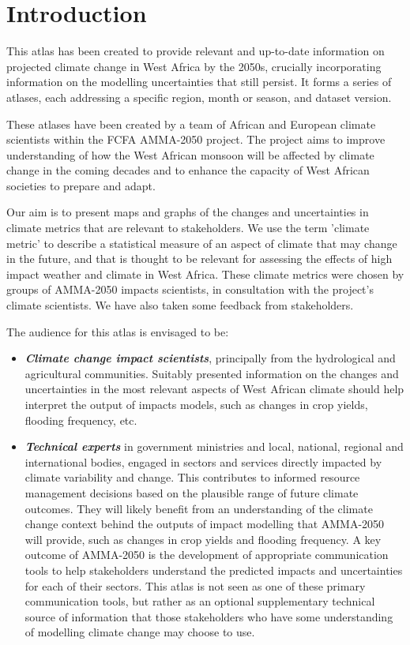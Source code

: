 \section{Introduction} \label{sec:intro}

This atlas has been created to provide relevant and up-to-date information on projected climate change in West Africa by the 2050s, crucially incorporating information on the modelling uncertainties that still persist. It forms a series of atlases, each addressing a specific region, month or season, and dataset version.

These atlases have been created by a team of African and European climate scientists within the FCFA AMMA-2050 project. The project aims to improve understanding of how the West African monsoon will be affected by climate change in the coming decades and to enhance the capacity of West African societies to prepare and adapt. 

Our aim is to present maps and graphs of the changes and uncertainties in climate metrics that are relevant to stakeholders. We use the term 'climate metric' to describe a statistical measure of an aspect of climate that may change in the future, and that is thought to be relevant for assessing the effects of high impact weather and climate in West Africa. These climate metrics were chosen by groups of AMMA-2050 impacts scientists, in consultation with the project's climate scientists. We have also taken some feedback from stakeholders.

The audience for this atlas is envisaged to be:

\begin{itemize}
  \item \textbf{\textit{Climate change impact scientists}}, principally from the hydrological and agricultural communities. Suitably presented information on the changes and uncertainties in the most relevant aspects of West African climate should help interpret the output of impacts models, such as changes in crop yields, flooding frequency, etc.
  \item \textbf{\textit{Technical experts}} in government ministries and local, national, regional and international bodies, engaged in sectors and services directly impacted by climate variability and change. This contributes to informed resource management decisions based on the plausible range of future climate outcomes. They will likely benefit from an understanding of the climate change context behind the outputs of impact modelling that AMMA-2050 will provide, such as changes in crop yields and flooding frequency. A key outcome of AMMA-2050 is the development of appropriate communication tools to help stakeholders understand the predicted impacts and uncertainties for each of their sectors. This atlas is not seen as one of these primary communication tools, but rather as an optional supplementary technical source of information that those stakeholders who have some understanding of modelling climate change may choose to use.
\end{itemize}

